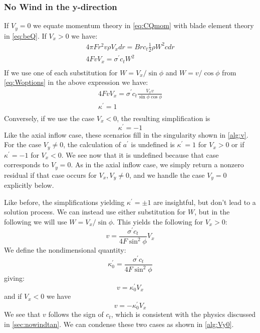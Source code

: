 \documentclass{article}
\begin{document}
\subsubsection{No Wind in the y-direction}

If $V_y = 0$ we equate momentum theory in \cref{eq:CQmom} with blade element theory in \cref{eq:beQ}.  If $V_x > 0$ we have:
\begin{equation}
\begin{aligned}
4 \pi F r^2 v \rho V_x dr = B r c_t \frac{1}{2} \rho W^2 c dr\\
4  F v  V_x  = \sigma^\prime c_t  W^2 \\
\end{aligned}
\end{equation}
If we use one of each substitution for $W = V_x/\sin\phi$ and $W = v/\cos\phi$ from \cref{eq:Woptions} in the above expression we have:
\begin{equation}
\begin{aligned}
4  F v  V_x  = \sigma^\prime c_t \frac{V_x v}{\sin\phi \cos\phi} \\
\kappa^\prime = 1\\
\end{aligned}
\end{equation}
Conversely, if we use the case $V_x < 0$, the resulting simplification is
\begin{equation}
    \kappa^\prime = -1
\end{equation}
Like the axial inflow case, these scenarios fill in the singularity shown in \cref{alg:v}.  For the case $V_y \ne 0$, the calculation of $a^\prime$ is undefined is $\kappa^\prime = 1$ for $V_x > 0$ or if $\kappa^\prime = -1$ for $V_x < 0$.  We see now that it is undefined because that case corresponds to $V_y = 0$.  As in the axial inflow case, we simply return a nonzero residual if that case occurs for $V_x,V_y \ne 0$, and we handle the case $V_y = 0$ explicitly below.



Like before, the simplifications yielding $\kappa^\prime = \pm1$ are insightful, but don't lead to a solution process.  We can instead use either substitution for $W$, but in the following we will use $W = V_x / \sin\phi$.  This yields the following for $V_x > 0$:
\begin{equation}
    v = \frac{\sigma^\prime c_t}{4 F \sin^2\phi} V_x
\end{equation}
We define the nondimensional quantity:
\begin{equation}
\kappa_0^\prime = \frac{\sigma^\prime c_t}{4 F \sin^2\phi}
\end{equation}
giving:
\begin{equation}
v = \kappa_0^\prime V_x
\end{equation}
and if $V_x < 0$ we have
\begin{equation}
    v = -\kappa_0^\prime V_x
\end{equation}
We see that $v$ follows the sign of $c_t$, which is consistent with the physics discussed in \cref{sec:nowindtan}.  We can condense these two cases as shown in \cref{alg:Vy0}.
\end{document}
